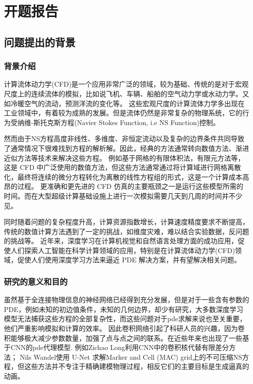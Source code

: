 
\chapter{开题报告}
\section{问题提出的背景}

\subsection{背景介绍}
计算流体动力学(CFD)是一个应用非常广泛的领域，较为基础、传统的是对于宏观尺度上的连续流体的模拟，比如说飞机、车辆、船舶的空气动力学或水动力学。又如冷暖空气的流动，预测洋流的变化等。
这些宏观尺度的计算流体力学多出现在工业领域中，有着较为成熟的发展。但是流体仍然是非常复杂的物理系统，它的行为受纳维-斯托克斯方程(Navier Stokes Function, i.e NS Function)控制。

然而由于NS方程高度非线性、多维度、非恒定流动以及复杂的边界条件共同导致了通常情况下很难找到方程的解析解。因此，经典的方法通常转向数值方法、渐进近似方法等技术来解决这些方程。
例如基于网格的有限体积法，有限元方法等，这是 CFD 中广泛使用的数值方法，但这些方法通常通过将计算域进行网格离散化，最终将连续的微分方程转化为离散的线性方程组的形式，这是一个计算成本高昂的过程。
更准确和更先进的 CFD 仿真的主要瓶颈之一是运行这些模型所需的时间。而在大型超级计算基础设施上进行一次模拟需要几天到几周的时间并不少见。

同时随着问题的复杂程度升高，计算资源指数增长，计算速度精度要求不断提高，传统的数值计算方法遇到了一定的挑战，如维度灾难，难以结合实验数据，反问题的挑战等。
近年来，深度学习在计算机视觉和自然语言处理方面的成功应用，促使人们探索人工智能在科学计算领域的应用，特别是在计算流体动力学(CFD)领域，促使人们使用深度学习方法来逼近 PDE 解决方案，并有望解决相关问题。



\subsection{研究的意义和目的}
虽然基于全连接物理信息的神经网络已经得到充分发展，但是对于一些含有参数的PDE，例如未知的初边值条件，未知的几何边界，却少有研究，大多数深度学习模型无法捕获这些方程的全部复杂性，而这些问题对于pde求解来说也至关重要，他们严重影响模拟和计算的效率。
因此卷积网络引起了科研人员的兴趣，因为卷积能够极大减少参数数量，加强了点与点之间的联系。在近些年来也出现了一些基于CNN的pde代理模型.
例如Zichao Long利用CNN中的卷积核代替有限差分方法\cite{pmlr-v80-long18a}；
Nils Wandel使用 U-Net 求解Marker and Cell (MAC) grid上的不可压缩NS方程\cite{Wandel2021Learning}，但这些方法并不专注于精确建模物理过程，相反它们的主要目标是生成逼真的动画。

